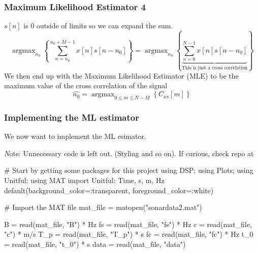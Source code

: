 \documentclass[compress]{beamer}
\DeclareMathOperator*{\argmax}{argmax}
\begin{document}
\begin{frame} %
  \frametitle{Maximum Likelihood Estimator 4}
    $s[n]$ is 0 outside of limits so we can expand the sum.
    \begin{equation*}
        \argmax_{n_0}
        \left\{
        \sum^{n_0+M-1}_{n=n_0}{x[n]s[n-n_0]}
        \right\} = 
        \argmax_{n_0}\left\{
            \underbrace{ \sum^{N-1}_{n=0}{x[n]s[n-n_0]} }_{
                \text{This is just a cross correlation}
            }
        \right\}
    \end{equation*}
    We then end up with the Maximum Likelihood Estimator (MLE) to be the
    maximum value of the cross correlation of the signal
    \begin{equation*}
    \widehat{n_0}=\argmax_{0\le m \le N-M}\left\{C_{xs}\left[m\right]\right\}
    \end{equation*}
\end{frame} %

\begin{frame}[fragile] %
    \frametitle{Implementing the ML estimator}
    We now want to implement the ML esimator.

    {\emph Note: Unnecessary code is left out. (Styling and so on). If curious,
    check repo at \href{}{}}
    \begin{jllisting}[gobble=8]
        #  Start by getting some packages for this project
        using DSP; using Plots; using Unitful; using MAT
        import Unitful: Time, s, m, Hz
        default(background_color=:transparent, foreground_color=:white)

        # Import the MAT file 
        mat_file = matopen("sonardata2.mat")

        B    = read(mat_file, "B")    * Hz
        fs   = read(mat_file, "fs")   * Hz
        c    = read(mat_file, "c")    * m/s
        T_p  = read(mat_file, "T_p")  * s
        fc   = read(mat_file, "fc")   * Hz
        t_0  = read(mat_file, "t_0")  * s
        data = read(mat_file, "data")
    \end{jllisting}
\end{frame} 
\end{document}
